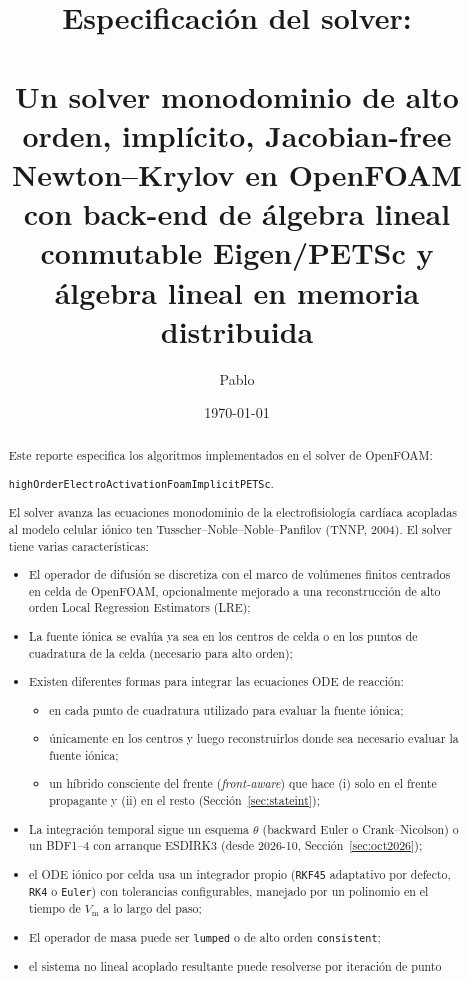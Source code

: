 \documentclass[11pt,a4paper]{article}
\title{Especificación del solver:\\
       \texorpdfstring{\code{highOrderElectroActivationFoamImplicitPETScDistributed}}{highOrderElectroActivationFoamImplicitPETScDistributed}\\
       \large Un solver monodominio de alto orden, implícito, Jacobian-free
       Newton--Krylov en OpenFOAM con back-end de álgebra lineal conmutable
       Eigen/PETSc y álgebra lineal en memoria distribuida}
\author{Pablo}
\date{\today}
\newcommand{\code}[1]{\texttt{\small #1}}
\newcommand{\Vm}{V_{\text{m}}}
\begin{document}
\maketitle

\begin{abstract}
Este reporte especifica los algoritmos implementados en el solver de OpenFOAM:

\begin{center}
\code{highOrderElectroActivationFoamImplicitPETSc}.
\end{center}

El solver avanza las ecuaciones
monodominio de la electrofisiología cardíaca acopladas al modelo celular iónico
ten Tusscher--Noble--Noble--Panfilov (TNNP, 2004). El solver tiene varias características:
\begin{itemize}
\item El operador de difusión se
discretiza con el marco de volúmenes finitos centrados en celda de OpenFOAM,
opcionalmente mejorado a una reconstrucción de alto orden Local
Regression Estimators (LRE);
\item La fuente iónica se evalúa ya sea en los centros de
celda o en los puntos de cuadratura de la celda (necesario para alto orden);
\item Existen diferentes formas para integrar las ecuaciones ODE de reacción:
\begin{itemize}
\item[(i)] en cada punto de cuadratura utilizado para evaluar la fuente iónica;
\item[(ii)] únicamente en los centros y luego reconstruirlos donde sea necesario evaluar la fuente iónica;
\item[(iii)] un híbrido consciente del frente (\emph{front-aware}) que hace (i) solo en el frente propagante y (ii) en el resto (Sección~\ref{sec:stateint});
\end{itemize}
\item La integración temporal sigue un esquema $\theta$ (backward Euler o
Crank--Nicolson) o un BDF1--4 con arranque ESDIRK3 (desde 2026-10,
Sección~\ref{sec:oct2026});
\item el ODE iónico
por celda usa un integrador propio (\code{RKF45} adaptativo por defecto,
\code{RK4} o \code{Euler}) con tolerancias configurables, manejado por un
polinomio en el tiempo de $\Vm$ a lo largo del paso;
\item El operador de masa puede ser \code{lumped} o de alto orden \code{consistent};
\item el sistema no lineal acoplado resultante puede resolverse por iteración de punto

\end{itemize}
\end{abstract}
\end{document}
